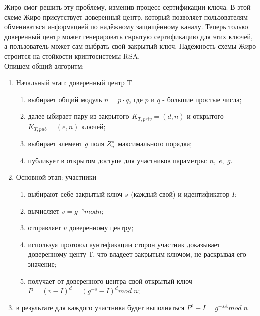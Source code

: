 \documentclass[a4paper]{article}
\begin{document}
Жиро смог решить эту проблему, изменив процесс сертификации ключа. В  этой схеме Жиро присутствует доверенный центр,  который позволяет пользователям обмениваться информацией 
по надёжному защищённому каналу. Теперь только доверенный центр может генерировать скрытую сертификацию для этих ключей, а пользователь может сам выбрать свой закрытый ключ. 
Надёжность схемы Жиро строится на стойкости криптосистемы RSA.
\\
Опишем общий алгоритм:
\begin{enumerate}
    \item Начальный этап: доверенный центр Т
    \begin{enumerate}
        \item выбирает общий модуль $n = p \cdot q$, где $p$ и $q$ - большие простые числа;
        \item далее ыбирает пару из закрытого $K_{T, priv} = (d,n)$ и открытого $K_{T, pub}=(e,n)$ ключей; 
        \item выбирает элемент $g$ поля $Z_n^\times$ максимального порядка;
        \item публикует в открытом доступе для участников параметры: $n, \; e, \; g$.
    \end{enumerate}
    \item Основной этап: участники
    \begin{enumerate}
        \item выбирают себе закрытый ключ $s$ (каждый свой) и идентификатор $I$;
        \item вычисляет $v = g ^{-s} mod n$;
        \item отправляет $v$ доверенному центру;
        \item используя протокол аунтефикации сторон участник доказывает доверенному центу Т, что владеет закрытым ключом, не раскрывая его значение;
        \item получает от доверенного центра свой открытый ключ $P = (v - I)^d = (g^{-s} -I)^d mod \; n$;
    \end{enumerate}
    \item в результате для каждого участника будет выполняться $P^e+I = g^{-sA} mod \; n$
\end{enumerate}
\end{document}
